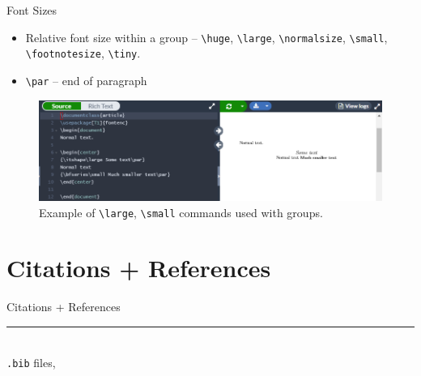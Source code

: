 \documentclass{beamer}
\begin{document}
{  \begin{frame}{Font Sizes}
  \begin{itemize}
    \item Relative font size within a group -- \texttt{\textbackslash huge}, \texttt{\textbackslash large}, \texttt{\textbackslash normalsize}, \texttt{\textbackslash small}, \texttt{\textbackslash footnotesize}, \texttt{\textbackslash tiny}.
    \item \texttt{\textbackslash par} -- end of paragraph
  \end{itemize}
    \begin{figure}
      \includegraphics[width=0.8\linewidth]{day02-02D-fontsize.png}
      \caption{Example of \texttt{\textbackslash large}, \texttt{\textbackslash small} commands used with groups.}
      \label{fig:day02-02D}
    \end{figure}
  \end{frame}

\section{Citations + References}

  \begin{frame}[plain]
    \vfill
    \centering
    \begin{beamercolorbox}[sep=8pt,center,shadow=true,rounded=true]{Citations + References}
      \insertsectionhead\par%
      \color{davisblue}\noindent\rule{10cm}{1pt} \\
      \footnotesize{\texttt{.bib} files, }
    \end{beamercolorbox}
    \vfill
  \end{frame}

}
\end{document}
